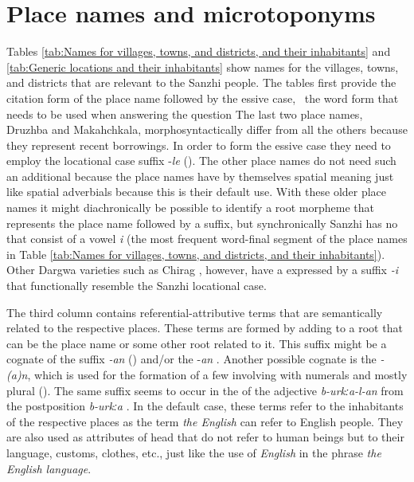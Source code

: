 \chapter{Place names and microtoponyms}
\label{cpt:morph-placenames}

Tables \ref{tab:Names for villages, towns, and districts, and their inhabitants} and \ref{tab:Generic locations and their inhabitants} show names for the villages, towns, and districts that are relevant to the Sanzhi people. The tables first provide the citation form of the place name followed by the essive case, \tie\ the word form that needs to be used when answering the question  The last two place names, Druzhba and Makahchkala, morphosyntactically differ from all the others because they represent recent borrowings. In order to form the essive case they need to employ the locational case suffix -\textit{le} (). The other place names do not need such an additional  because the place names have by themselves spatial meaning just like spatial adverbials because this is their default use. With these older place names it might diachronically be possible to identify a root morpheme that represents the place name followed by a  suffix, but synchronically Sanzhi has no  that consist of a vowel \textit{i} (the most frequent word-final segment of the place names in Table \ref{tab:Names for villages, towns, and districts, and their inhabitants}).  Other Dargwa varieties such as Chirag \citep{GanenkovChiragSketch}, however, have a  expressed by a suffix \textit{-i} that functionally resemble the Sanzhi locational case.

The third column contains referential-attributive terms that are semantically related to the respective places. These terms are formed by adding  to a root that can be the place name or some other root related to it. This suffix might be a cognate of the  suffix \textit{-an} () and/or the  -\textit{an} . Another possible cognate is the  \textit{-(a)n}, which is used for the formation of a few  involving  with numerals and mostly plural  (). The same suffix seems to occur in the  of the adjective \textit{b-urkːa-l-an}  from the postposition \textit{b-urkːa} . In the default case, these terms refer to the inhabitants of the respective places as the term \textit{the English} can refer to English people. They are also used as attributes of head  that do not refer to human beings but to their language, customs, clothes, etc., just like the use of \textit{English} in the phrase \textit{the English language}.

